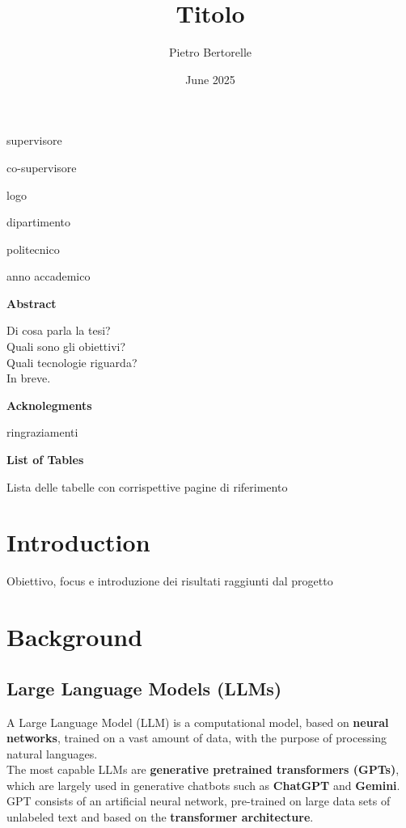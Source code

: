 \documentclass[12pt]{article}
\title{Titolo}
\author{Pietro Bertorelle}
\date{June 2025}
\begin{document}
\maketitle
supervisore

co-supervisore

logo

dipartimento

politecnico

anno accademico

\clearpage
\textbf{Abstract}

Di cosa parla la tesi?\\
Quali sono gli obiettivi?\\ 
Quali tecnologie riguarda?\\
In breve.

\textbf{Acknolegments}

ringraziamenti\\
\clearpage
\tableofcontents
\clearpage
\listoffigures
\clearpage
\textbf{List of Tables}

Lista delle tabelle con corrispettive pagine di riferimento
\clearpage
\section{Introduction}

Obiettivo, focus e introduzione dei risultati raggiunti dal progetto
\clearpage
\section{Background}
    \subsection{Large Language Models (LLMs)}
A Large Language Model (LLM) is a computational model, based on \textbf{neural networks}, trained on a vast amount of data, with the purpose of processing natural languages.\\
The most capable LLMs are \textbf{generative pretrained transformers (GPTs)}, which are largely used in generative chatbots such as \textbf{ChatGPT} and \textbf{Gemini}. GPT consists of an artificial neural network, pre-trained on large data sets of unlabeled text and based on the \textbf{transformer architecture}.
\end{document}
